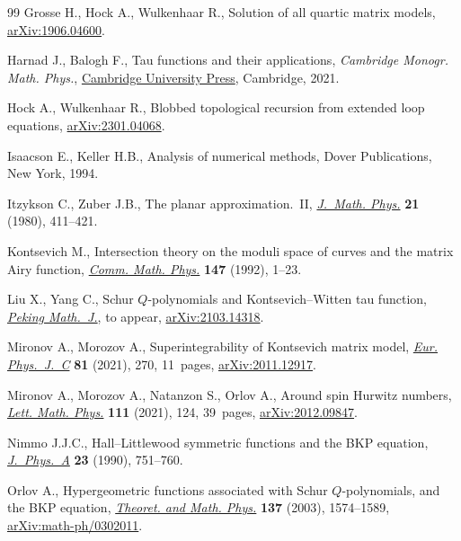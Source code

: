 \documentclass[pdftex]{sigma}
\numberwithin{equation}{section}
\begin{document}
\begin{thebibliography}{99}
Grosse H., Hock A., Wulkenhaar R., Solution of all quartic matrix models,
 \href{https://arxiv.org/abs/1906.04600}{arXiv:1906.04600}.

Harnad J., Balogh F., Tau functions and their applications, \textit{Cambridge Monogr. Math. Phys.}, \href{https://doi.org/10.1017/9781108610902}{Cambridge University Press}, Cambridge, 2021.

Hock A., Wulkenhaar R., Blobbed topological recursion from extended loop
 equations, \href{https://arxiv.org/abs/2301.04068}{arXiv:2301.04068}.

Isaacson E., Keller H.B., Analysis of numerical methods, Dover Publications,
 New York, 1994.

Itzykson C., Zuber J.B., The planar approximation.~{II}, \href{https://doi.org/10.1063/1.524438}{\textit{J.~Math.
 Phys.}} \textbf{21} (1980), 411--421.

Kontsevich M., Intersection theory on the moduli space of curves and the matrix
 {A}iry function, \href{https://doi.org/10.1007/BF02099526}{\textit{Comm. Math. Phys.}} \textbf{147} (1992), 1--23.

Liu X., Yang C., Schur ${Q}$-polynomials and {K}ontsevich--{W}itten tau
 function, \href{https://doi.org/10.1007/s42543-023-00064-6}{\textit{Peking Math.~J.}}, {t}o appear, \href{https://arxiv.org/abs/2103.14318}{arXiv:2103.14318}.

Mironov A., Morozov A., Superintegrability of {K}ontsevich matrix model,
 \href{https://doi.org/10.1140/epjc/s10052-021-09030-x}{\textit{Eur. Phys.~J.~C}} \textbf{81} (2021), 270, 11~pages,
 \href{https://arxiv.org/abs/2011.12917}{arXiv:2011.12917}.

Mironov A., Morozov A., Natanzon S., Orlov A., Around spin {H}urwitz numbers,
 \href{https://doi.org/10.1007/s11005-021-01457-3}{\textit{Lett. Math. Phys.}} \textbf{111} (2021), 124, 39~pages,
 \href{https://arxiv.org/abs/2012.09847}{arXiv:2012.09847}.

Nimmo J.J.C., Hall--{L}ittlewood symmetric functions and the {BKP} equation,
 \href{https://doi.org/10.1088/0305-4470/23/5/018}{\textit{J.~Phys.~A}} \textbf{23} (1990), 751--760.

Orlov A., Hypergeometric functions associated with {S}chur {$Q$}-polynomials,
 and the {BKP} equation, \href{https://doi.org/10.1023/A:1027370004436}{\textit{Theoret. and Math. Phys.}} \textbf{137}
 (2003), 1574--1589, \href{https://arxiv.org/abs/math-ph/0302011}{arXiv:math-ph/0302011}.


\end{thebibliography}
\end{document}
